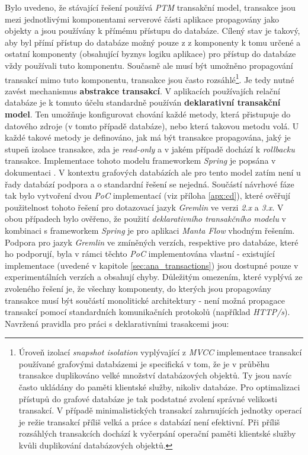 Bylo uvedeno, že stávající řešení používá \textit{PTM} transakční model, transakce jsou mezi jednotlivými komponentami serverové části aplikace propagovány jako objekty a jsou používány k přímému přístupu do databáze. Cílený stav je takový, aby byl přímí přístup do databáze možný pouze z z komponenty k tomu určené a ostatní komponenty (obsahující byznys logiku aplikace) pro přístup do databáze vždy používali tuto komponentu. Současně ale musí být umožněno propagování transakcí mimo tuto komponentu, transakce jsou často rozsáhlé\footnote{Úroveň izolací \textit{snapshot isolation} vyplývající z \textit{MVCC} implementace transakcí používané grafovými databázemi je specifická v tom, že je v průběhu transakce duplikováno velké množství databázových objektů. Ty jsou navíc často ukládány do paměti klientské služby, nikoliv databáze. Pro optimalizaci přístupů do grafové databáze je tak podstatné zvolení správné velikosti transakcí. V případě minimalistických transakcí zahrnujících jednotky operací je režie transakcí příliš velká a práce s databází není efektivní. Při příliš rozsáhlých transakcích dochází k vyčerpání operační paměti klientské služby kvůli duplikování databázových objektů.}. Je tedy nutné zavést mechanismus \textbf{abstrakce transakcí}.
V aplikacích používajích relační databáze je k tomuto účelu standardně používán \textbf{deklarativní transakční model}. Ten umožňuje konfigurovat chování každé metody, která přistupuje do datového zdroje (v tomto případě databáze), nebo která takovou metodu volá. U každé takové metody je definováno, jak má být transakce propagována, jaký je stupeň izolace transakce, zda je \textit{read-only} a v jakém případě dochází k \textit{rollbacku} transakce. Implementace tohoto modelu frameworkem \textit{Spring} je popsána v dokumentaci \cite{SpringTransactions}.
V kontextu grafových databázích ale pro tento model zatím není u řady databází podpora a o standardní řešení se nejedná. Součástí návrhové fáze tak bylo vytvoření dvou \textit{PoC} implementací (viz příloha \ref{apx:cd}), které ověřují použitelnost tohoto řešení pro dotazovací jazyk \textit{Gremlin} ve verzi \textit{2.x} a \textit{3.x}. V obou případech bylo ověřeno, že použití \textit{deklarativního transakčního modelu} v kombinaci s frameworkem \textit{Spring} je pro aplikaci \textit{Manta Flow} vhodným řešením. Podpora pro jazyk \textit{Gremlin} ve zmíněných verzích, respektive pro databáze, které ho podporují, byla v rámci těchto \textit{PoC} implementována vlastní - existující implementace (uvedené v kapitole \ref{sec:ana_transactions}) jsou dostupné pouze v experimentálních verzích a obsahují chyby.
Důležitým omezením, které vyplývá ze zvoleného řešení je, že všechny komponenty, do kterých jsou propagovány transakce musí být součástí monolitické architektury - není možná propagace transakcí pomocí standardních komunikačních protokolů (například \textit{HTTP/s}). Navržená pravidla pro práci s deklarativními trasakcemi jsou:

